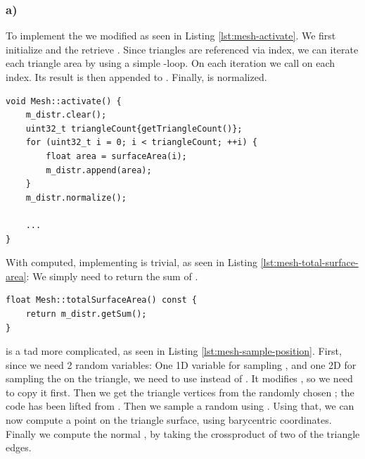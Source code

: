\subsubsection*{a)} \label{sec:3-1-a}

To implement the  we modified  as seen in Listing \ref{lst:mesh-activate}. We first initialize  and the retrieve . Since triangles are referenced via index, we can iterate each triangle area by using a simple -loop. On each iteration we call  on each index. Its result is then appended to . Finally,  is normalized.

\begin{lstlisting}[caption={\code{Mesh::activate}},label={lst:mesh-activate}]
void Mesh::activate() {
    m_distr.clear();
    uint32_t triangleCount{getTriangleCount()};
    for (uint32_t i = 0; i < triangleCount; ++i) {
        float area = surfaceArea(i);
        m_distr.append(area);
    }
    m_distr.normalize();
    
    ...
}
\end{lstlisting}

With  computed, implementing  is trivial, as seen in Listing \ref{lst:mesh-total-surface-area}: We simply need to return the sum of .

\begin{lstlisting}[caption={\code{Mesh::totalSurfaceArea}},label={lst:mesh-total-surface-area}]
float Mesh::totalSurfaceArea() const {
    return m_distr.getSum();
}
\end{lstlisting}

 is a tad more complicated, as seen in Listing \ref{lst:mesh-sample-position}. First, since we need 2 random variables: One 1D variable for sampling , and one 2D for sampling the  on the triangle, we need to use  instead of . It modifies , so we need to copy it first. Then we get the triangle vertices from the randomly chosen ; the code has been lifted from . Then we sample a random  using . Using that, we can now compute a point  on the triangle surface, using barycentric coordinates. Finally we compute the normal , by taking the crossproduct of two of the triangle edges.

